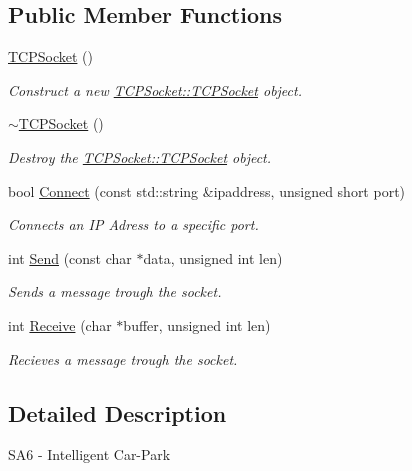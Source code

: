 \subsection*{Public Member Functions}
\begin{DoxyCompactItemize}
\item 
\mbox{\hyperlink{class_t_c_p_socket_a7a50427a401d1a6f3209d51818bad901}{T\+C\+P\+Socket}} ()
\begin{DoxyCompactList}\small\item\em Construct a new \mbox{\hyperlink{class_t_c_p_socket_a7a50427a401d1a6f3209d51818bad901}{T\+C\+P\+Socket\+::\+T\+C\+P\+Socket}} object. \end{DoxyCompactList}\item 
\mbox{\label{class_t_c_p_socket_af357e6923a0f8adbbb8e46fab4523991}} 
\mbox{\hyperlink{class_t_c_p_socket_af357e6923a0f8adbbb8e46fab4523991}{$\sim$\+T\+C\+P\+Socket}} ()
\begin{DoxyCompactList}\small\item\em Destroy the \mbox{\hyperlink{class_t_c_p_socket_a7a50427a401d1a6f3209d51818bad901}{T\+C\+P\+Socket\+::\+T\+C\+P\+Socket}} object. \end{DoxyCompactList}\item 
bool \mbox{\hyperlink{class_t_c_p_socket_ac816c30175550d8d9a14c89c1c5ec8da}{Connect}} (const std\+::string \&ipaddress, unsigned short port)
\begin{DoxyCompactList}\small\item\em Connects an IP Adress to a specific port. \end{DoxyCompactList}\item 
int \mbox{\hyperlink{class_t_c_p_socket_acc5345a54a874aafb3389489f2c1c846}{Send}} (const char $\ast$data, unsigned int len)
\begin{DoxyCompactList}\small\item\em Sends a message trough the socket. \end{DoxyCompactList}\item 
int \mbox{\hyperlink{class_t_c_p_socket_a8341c9364e71e992aa61534dbf88a2a2}{Receive}} (char $\ast$buffer, unsigned int len)
\begin{DoxyCompactList}\small\item\em Recieves a message trough the socket. \end{DoxyCompactList}\end{DoxyCompactItemize}


\subsection{Detailed Description}
S\+A6 -\/ Intelligent Car-\/\+Park 


